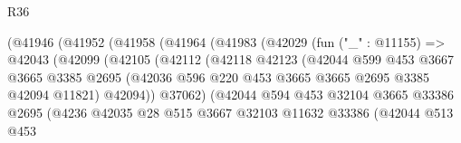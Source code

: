 \begin{lexlean}{R36}
\begin{coremodule}
                          (@41946
                            (@41952
                              (@41958
                                (@41964
                                  (@41983
                                    (@42029
                                      (fun ("_" : @11155) =>
                                      @42043
                                        (@42099
                                          (@42105
                                            (@42112
                                              (@42118
                                                @42123
                                                (@42044
                                                  @599
                                                  @453
                                                  @3667
                                                  @3665
                                                  @3385
                                                  @2695
                                                  (@42036
                                                    @596
                                                    @220
                                                    @453
                                                    @3665
                                                    @3665
                                                    @2695
                                                    @3385
                                                    @42094
                                                    @11821)
                                                  @42094))
                                              @37062)
                                            (@42044
                                              @594
                                              @453
                                              @32104
                                              @3665
                                              @33386
                                              @2695
                                              (@4236
                                                @42035
                                                @28
                                                @515
                                                @3667
                                                @32103
                                                @11632
                                                @33386
                                                (@42044
                                                  @513
                                                  @453

\end{coremodule}
\end{lexlean}
